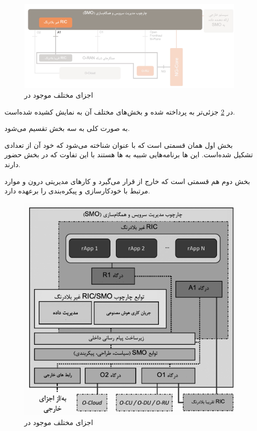 \documentclass{CSICC}
\begin{document}
\begin{figure}
	\includegraphics[width=\columnwidth]{Images/nonert-ric1.png}
	\centering
	\caption{اجزای مختلف موجود در
		}
	\label{fig:nonert-ric1}
\end{figure}

در 
\ref{fig:nonert-ric2}
جزئی‌تر به
پرداخته شده و بخش‌های مختلف آن به نمایش کشیده شده‌است.

به صورت کلی
به سه بخش تقسیم می‌شود.

بخش اول همان قسمتی است که با عنوان 
شناخته می‌شود که خود آن از تعدادی
تشکیل شده‌است. این
ها
برنامه‌هایی شبیه به 
ها 
هستند با این تفاوت که در بخش 
حضور دارند.

بخش دوم هم قسمتی است که خارج از
قرار می‌گیرد و کارهای مدیریتی درون 
و موارد مرتبط با خودکارسازی و پیکره‌بندی را برعهده دارد.

\begin{figure}
	\includegraphics[width=\columnwidth]{Images/nonert-ric2.png}
	\centering
	\caption{اجزای مختلف موجود در
		}
	\label{fig:nonert-ric2}
\end{figure}
\end{document}
